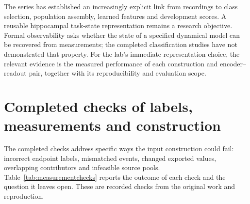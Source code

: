 \documentclass[10pt,a4paper]{article}
\begin{document}
The series has established an increasingly explicit link from recordings to class selection, population assembly, learned features and development scores. A reusable hippocampal task-state representation remains a research objective. Formal observability asks whether the state of a specified dynamical model can be recovered from measurements; the completed classification studies have not demonstrated that property. For the lab's immediate representation choice, the relevant evidence is the measured performance of each construction and encoder--readout pair, together with its reproducibility and evaluation scope.

\appendix
\clearpage
\section{Completed checks of labels, measurements and construction}\label{app:measurement}
The completed checks address specific ways the input construction could fail: incorrect endpoint labels, mismatched events, changed exported values, overlapping contributors and infeasible source pools. Table~\ref{tab:measurementchecks} reports the outcome of each check and the question it leaves open. These are recorded checks from the original work and reproduction.
\end{document}
